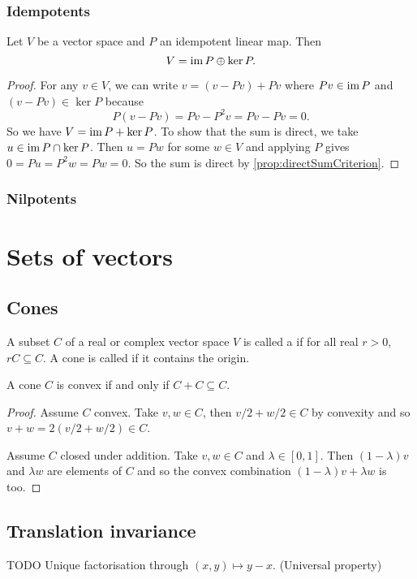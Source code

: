 \subsubsection{Idempotents}
\begin{proposition} \label{prop:directSumKernelImageIdempotent}
Let $V$ be a vector space and $P$ an idempotent linear map. Then
\[ V = \operatorname{im} P \oplus \ker P. \]
\end{proposition}
\begin{proof}
For any $v\in V$, we can write $v= (v-Pv)+Pv$ where $Pv\in \operatorname{im} P$ and $(v-Pv)\in \ker P$ because
\[ P(v-Pv) = Pv- P^2v = Pv - Pv = 0. \]
So we have $V = \operatorname{im} P + \ker P$. To show that the sum is direct, we take $u\in \operatorname{im} P \cap \ker P$. Then $u = Pw$ for some $w\in V$ and applying $P$ gives $0 = Pu = P^2w = Pw = 0$. So the sum is direct by \ref{prop:directSumCriterion}.
\end{proof}
\subsubsection{Nilpotents}

\section{Sets of vectors}
\subsection{Cones}
\begin{definition}
A subset $C$ of a real or complex vector space $V$ is called a  if for all real $r>0$, $rC \subseteq C$. A cone is called  if it contains the origin.
\end{definition}

\begin{lemma} \label{lemma:convexityAdditiveClosure}
A cone $C$ is convex if and only if $C + C \subseteq C$. 
\end{lemma}
\begin{proof}
Assume $C$ convex. Take $v,w\in C$, then $v/2 + w/2\in C$ by convexity and so $v+w = 2(v/2+w/2)\in C$.

Assume $C$ closed under addition. Take $v,w\in C$ and $\lambda\in[0,1]$. Then $(1-\lambda)v$ and $\lambda w$ are elements of $C$ and so the convex combination $(1-\lambda)v + \lambda w$ is too.
\end{proof}


\subsection{Translation invariance}
TODO Unique factorisation through $(x,y)\mapsto y-x$. (Universal property)

